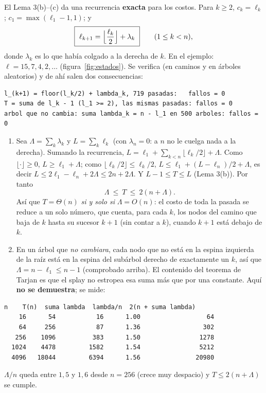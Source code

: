 \documentclass[11pt]{article}
\begin{document}
El Lema 3(b)--(c) da una recurrencia \textbf{exacta} para los costos. Para $k\ge2$, $c_k=\ell_k$; $c_1=\max(\ell_1-1,1)$; y
\[
\boxed{\ \ell_{k+1}=\Bigl\lfloor\frac{\ell_k}{2}\Bigr\rfloor+\lambda_k\ }\qquad(1\le k<n),
\]
donde $\lambda_k$ es lo que había colgado a la derecha de $k$. En el ejemplo: $\ell=15,7,4,2,\dots$ (figura~\ref{fig:estados}). Se verifica (en caminos y en árboles aleatorios) y de ahí salen
dos consecuencias:
\begin{lstlisting}[style=salida,basicstyle=\ttfamily\footnotesize\color{black},columns=fixed]
l_(k+1) = floor(l_k/2) + lambda_k, 719 pasadas:   fallos = 0
T = suma de l_k - 1 (l_1 >= 2), las mismas pasadas: fallos = 0
arbol que no cambia: suma lambda_k = n - l_1 en 500 arboles: fallos = 0
\end{lstlisting}
\begin{enumerate}[leftmargin=18pt,itemsep=2pt]
\item Sea $\Lambda=\sum_k\lambda_k$ y $L=\sum_k\ell_k$ (con $\lambda_n=0$: a $n$ no le cuelga nada a la derecha). Sumando la recurrencia, $L=\ell_1+\sum_{k<n}\lfloor\ell_k/2\rfloor+\Lambda$.
Como $\lfloor\cdot\rfloor\ge0$, $L\ge\ell_1+\Lambda$; como $\lfloor\ell_k/2\rfloor\le\ell_k/2$, $L\le\ell_1+(L-\ell_n)/2+\Lambda$, es decir $L\le2\ell_1-\ell_n+2\Lambda\le2n+2\Lambda$.
Y $L-1\le T\le L$ (Lema 3(b)). Por tanto
\[
\Lambda\ \le\ T\ \le\ 2(n+\Lambda) .
\]
Así que $T=\Theta(n)$ \emph{si y solo si} $\Lambda=O(n)$: el costo de toda la pasada se reduce a un solo número, que cuenta, para cada $k$, los nodos del camino que baja de $k$ hasta su sucesor $k+1$ (sin contar a $k$), cuando $k+1$ está debajo de $k$.
\item En un árbol que \emph{no cambiara}, cada nodo que no está en la espina izquierda de la raíz está en la espina del subárbol derecho de exactamente un $k$, así que $\Lambda=n-\ell_1\le n-1$ (comprobado arriba).
El contenido del teorema de Tarjan es que el splay no estropea esa suma más que por una constante. Aquí \textbf{no se demuestra}; se mide:
\end{enumerate}
\begin{lstlisting}[style=salida,basicstyle=\ttfamily\footnotesize\color{black},columns=fixed]
     n    T(n)  suma lambda  lambda/n  2(n + suma lambda)
    16      54           16      1.00                  64
    64     256           87      1.36                 302
   256    1096          383      1.50                1278
  1024    4478         1582      1.54                5212
  4096   18044         6394      1.56               20980
\end{lstlisting}
$\Lambda/n$ queda entre $1{,}5$ y $1{,}6$ desde $n=256$ (crece muy despacio) y $T\le2(n+\Lambda)$ se cumple.
\end{document}
